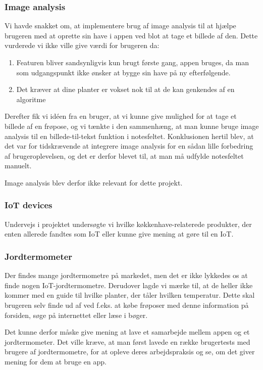 \subsubsection{Image analysis}
Vi havde snakket om, at implementere brug af image analysis til at hjælpe brugeren med at oprette sin have i appen ved blot at tage et billede af den. Dette vurderede vi ikke ville give værdi for brugeren da:
\begin{enumerate}
        \item Featuren bliver sandsynligvis kun brugt første gang, appen bruges, da man som udgangspunkt ikke ønsker at bygge sin have på ny efterfølgende. 
        \item Det kræver at dine planter er vokset nok til at de kan genkendes af en algoritme
\end{enumerate}

Derefter fik vi idéen fra en bruger, at vi kunne give mulighed for at tage et billede af en frøpose, og vi tænkte i den sammenhæng, at man kunne bruge image analysis til en billede-til-tekst funktion i notesfeltet. Konklusionen hertil blev, at det var for tidskrævende at integrere image analysis for en sådan lille forbedring af brugeroplevelsen, og det er derfor blevet til, at man må udfylde notesfeltet manuelt. 

Image analysis blev derfor ikke relevant for dette projekt.

\subsubsection{IoT devices}
Undervejs i projektet undersøgte vi hvilke køkkenhave-relaterede produkter, der enten allerede fandtes som IoT eller kunne give mening at gøre til en IoT.

\subsubsection*{Jordtermometer}
Der findes mange jordtermometre på markedet, men det er ikke lykkedes os at finde nogen IoT-jordtermometre. Derudover lagde vi mærke til, at de heller ikke kommer med en guide til hvilke planter, der tåler hvilken temperatur. Dette skal brugeren selv finde ud af ved f.eks. at købe frøposer med denne information på forsiden, søge på internettet eller læse i bøger. 

Det kunne derfor måske give mening at lave et samarbejde mellem appen og et jordtermometer. Det ville kræve, at man først lavede en række brugertests med brugere af jordtermometre, for at opleve deres arbejdspraksis og se, om det giver mening for dem at bruge en app.

